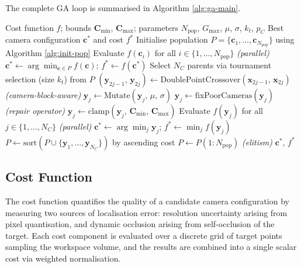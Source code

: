 The complete GA loop is summarised in Algorithm \ref{alg:ga-main}.

\begin{algorithm}[htbp]
\caption{Real-Coded Guided Genetic Algorithm for Optimised Camera Placement}
\label{alg:ga-main}
\begin{algorithmic}[1]
\REQUIRE Cost function $f$; bounds $\mathbf{C}_{\min}$, $\mathbf{C}_{\max}$; parameters $N_{\text{pop}}$, $G_{\max}$, $\mu$, $\sigma$, $k_t$, $p_C$
\ENSURE Best camera configuration $\mathbf{c}^*$ and cost $f^*$
\STATE Initialise population $P = \{\mathbf{c}_1, \ldots, \mathbf{c}_{N_{\text{pop}}}\}$ using Algorithm \ref{alg:init-pop}
\STATE Evaluate $f(\mathbf{c}_i)$ for all $i \in \{1, \ldots, N_{\text{pop}}\}$ \hfill \textit{(parallel)}
\STATE $\mathbf{c}^* \leftarrow \arg\min_{\mathbf{c} \in P} f(\mathbf{c})$; \quad $f^* \leftarrow f(\mathbf{c}^*)$
    \STATE Select $N_C$ parents via tournament selection (size $k_t$) from $P$
        \STATE $(\mathbf{y}_{2j-1},\, \mathbf{y}_{2j}) \leftarrow \text{DoublePointCrossover}(\mathbf{x}_{2j-1},\, \mathbf{x}_{2j})$ \hfill \textit{(camera-block-aware)}
    \ENDFOR
        \STATE $\mathbf{y}_j \leftarrow \text{Mutate}(\mathbf{y}_j,\, \mu,\, \sigma)$
            \STATE $\mathbf{y}_j \leftarrow \text{fixPoorCameras}(\mathbf{y}_j)$ \hfill \textit{(repair operator)}
        \ENDIF
        \STATE $\mathbf{y}_j \leftarrow \text{clamp}(\mathbf{y}_j,\, \mathbf{C}_{\min},\, \mathbf{C}_{\max})$
    \ENDFOR
    \STATE Evaluate $f(\mathbf{y}_j)$ for all $j \in \{1, \ldots, N_C\}$ \hfill \textit{(parallel)}
        \STATE $\mathbf{c}^* \leftarrow \arg\min_j \mathbf{y}_j$; \quad $f^* \leftarrow \min_j f(\mathbf{y}_j)$
    \ENDIF
    \STATE $P \leftarrow \text{sort}(P \cup \{\mathbf{y}_1, \ldots, \mathbf{y}_{N_C}\})$ by ascending cost
    \STATE $P \leftarrow P(1 : N_{\text{pop}})$ \hfill \textit{(elitism)}
\ENDFOR
\RETURN $\mathbf{c}^*$, $f^*$
\end{algorithmic}
\end{algorithm}

\subsection{Cost Function}
\label{sec:cost-function}

The cost function quantifies the quality of a candidate camera configuration by measuring two sources of localisation error: resolution uncertainty arising from pixel quantisation, and dynamic occlusion arising from self-occlusion of the target. Each cost component is evaluated over a discrete grid of target points sampling the workspace volume, and the results are combined into a single scalar cost via weighted normalisation.

